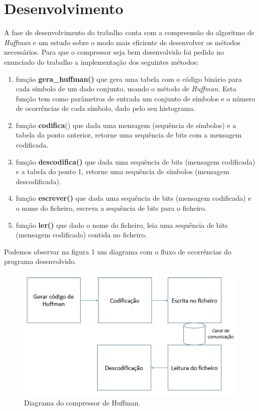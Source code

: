 \documentclass[12pt,a4paper]{article}
\begin{document}
\section{Desenvolvimento}
A fase de desenvolvimento do trabalho conta com a compreensão do algoritmo de \textit{Huffman} e um estudo sobre o modo mais eficiente de desenvolver os métodos necessários. Para que o compressor seja bem desenvolvido foi pedido no enunciado do trabalho a implementação dos seguintes métodos:
\begin{enumerate}
\item função \textbf{gera\_huffman()} que gera uma tabela com o código binário para cada símbolo de um dado conjunto, usando o método de \textit{Huffman}. Esta função tem como parâmetros de entrada um conjunto de símbolos e o número de ocorrências de cada símbolo, dado pelo seu histograma.
\item função \textbf{codifica}() que dada uma mensagem (sequência de símbolos) e a tabela da ponto anterior,
retorne uma sequência de bits com a mensagem codificada.
\item função \textbf{descodifica()} que dada uma sequência de bits (mensagem codificada) e a tabela do ponto 1, retorne uma sequência de símbolos (mensagem descodificada).
\item função \textbf{escrever()} que dada uma sequência de bits (mensagem codificada) e o nome do ficheiro,
escreva a sequência de bits para o ficheiro.
\item função \textbf{ler()} que dado o nome do ficheiro, leia uma sequência de bits (mensagem codificada) contida no ficheiro.
\end{enumerate}

Podemos observar na figura 1 um diagrama com o fluxo de ocorrências do programa desenvolvido.

\begin{figure}[h]
\centering
\includegraphics[width=.7\linewidth]{diagrama.jpg}
\caption{Diagrama do compressor de Huffman.}
\end{figure}
\end{document}
